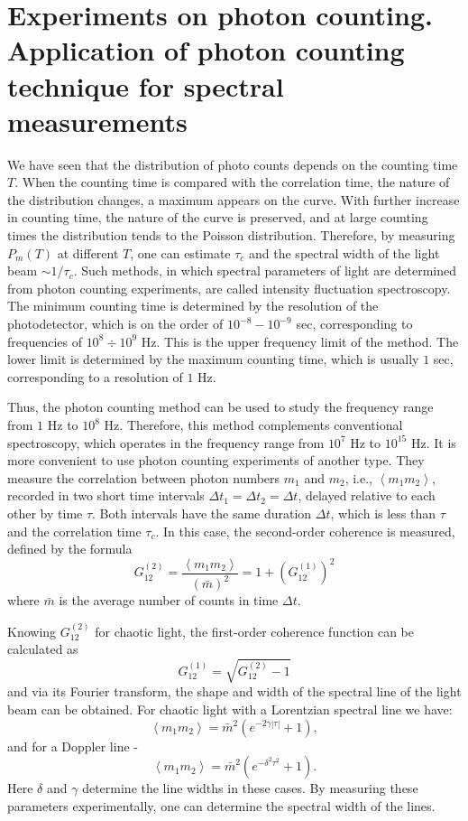 \section{Experiments on photon counting. Application of photon counting technique for spectral measurements}
We have seen that the distribution of photo counts depends on the counting time
$T$. When the counting time is compared with the correlation time, the nature of
the distribution changes, a maximum appears on the curve. With further
increase in counting time, the nature of the curve is preserved, and at large
counting times the distribution tends to the Poisson distribution. 
Therefore, by measuring $P_m\left(T\right)$ at different
$T$, one can estimate $\tau_c$ and the spectral width of the light beam $\sim
1/\tau_c$. Such methods, in which spectral parameters
of light are determined from photon counting experiments, are called intensity fluctuation spectroscopy. The minimum
counting time is determined by the resolution of the photodetector, which is on the order of
$10^{-8} - 10^{-9}$ sec, corresponding to frequencies of $10^{8}\div
10^{9}$ Hz. This is the upper frequency limit of the method. The lower
limit is determined by the maximum counting time, which is usually
$1$ sec, corresponding to a resolution of $1$ Hz.

Thus, the photon counting method can be used to study the frequency range
from $1$ Hz to $10^8$ Hz. Therefore, this method complements conventional
spectroscopy, which operates in the frequency range from $10^7$ Hz to
$10^{15}$ Hz. It is more convenient to use photon counting experiments
of another type. They measure the correlation between photon numbers $m_1$ and
$m_2$, i.e., $\left<m_1 m_2\right>$, recorded in two
short time intervals $\Delta t_1 = \Delta t_2 = \Delta t$,
delayed relative to each other by time $\tau$. Both intervals
have the same duration $\Delta t$, which is less than $\tau$ and the
correlation time $\tau_c$. In this case, the second-order coherence is measured,
defined by the formula
\[
G_{12}^{(2)} = \frac{\left<m_1 m_2\right>}{\left(\bar{m}\right)^2} = 
1 + \left(G_{12}^{(1)}\right)^2
\]
where $\bar{m}$ is the average number of counts in time $\Delta t$.

Knowing $G_{12}^{(2)}$ for chaotic light, the first-order coherence function can be calculated as
\[
G_{12}^{(1)} = \sqrt{G_{12}^{(2)} - 1}
\]
and via its Fourier transform, the shape and width of the spectral line of the light beam can be obtained. For chaotic light with
a Lorentzian spectral line we have:
\begin{equation}
\left<m_1 m_2\right> = \bar{m}^2\left(e^{-2 \gamma \left|\tau\right|}
+ 1\right),
\label{eqCh4_68}
\end{equation}
and for a Doppler line -
\begin{equation}
\left<m_1 m_2\right> = \bar{m}^2\left(e^{-\delta^2 \tau^2}
+ 1\right).
\label{eqCh4_69}
\end{equation}
Here $\delta$ and $\gamma$ determine the line widths in these
cases. By measuring these parameters experimentally, one can determine
the spectral width of the lines.
